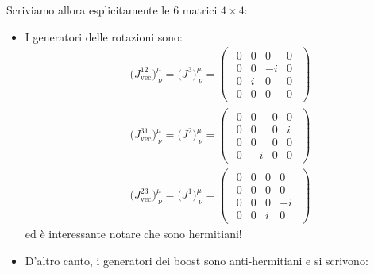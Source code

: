 \documentclass[../main.tex]{subfiles}
\begin{document}
\begin{exercise}
    Scriviamo allora esplicitamente le 6 matrici $4\times4$:
    \begin{itemize}
        \item I generatori delle rotazioni sono:
        \[\boxed{
        \begin{aligned}
            &\big(J^{12}_\text{vec}\big)^\mu_{~\nu} = \big(J^3\big)^\mu_{~\nu}
            =
            \begin{pmatrix}
            \begin{array}{c|ccc}
                 0   &   0   &   0   &   0\\
                \hline
                0   &   0   &   -i   &   0\\
                0   &   i   &   0   &   0\\
                0   &   0   &   0   &   0
            \end{array}
            \end{pmatrix} \\
            &\big(J^{31}_\text{vec}\big)^\mu_{~\nu} = \big(J^2\big)^\mu_{~\nu} = \begin{pmatrix}
            \begin{array}{c|ccc}
                 0   &   0   &   0   &   0\\
                \hline
                0   &   0   &   0   &   i\\
                0   &   0   &   0   &   0\\
                0   &   -i   &   0   &   0
            \end{array}
            \end{pmatrix}\\
            &\big(J^{23}_\text{vec}\big)^\mu_{~\nu} = \big(J^1\big)^\mu_{~\nu}= \begin{pmatrix}
            \begin{array}{c|ccc}
                 0   &   0   &   0   &   0\\
                \hline
                0   &   0   &   0   &   0\\
                0   &   0   &   0   &   -i\\
                0   &   0   &   i   &   0
            \end{array}
            \end{pmatrix}
        \end{aligned}}\]
        ed è interessante notare che sono hermitiani!
        
        \item D'altro canto, i generatori dei boost sono anti-hermitiani e si scrivono:


\end{itemize}
\end{exercise}
\end{document}
